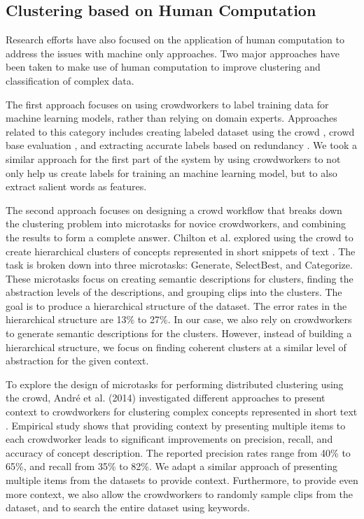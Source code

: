 \subsection{Clustering based on Human Computation}

Research efforts have also focused on the application of human computation 
to address the issues with machine only approaches. Two major approaches have
been taken to make use of human computation to improve clustering and 
classification of complex data. %

The first approach focuses on using crowdworkers to label training data for
machine learning models, rather than relying on domain experts. 
Approaches related to this category includes creating labeled dataset
using the crowd \cite{snow2008cheap}, crowd base evaluation
\cite{callison2009fast}, and extracting accurate labels based on redundancy
\cite{ipeirotis2010quality}. We took a similar approach for the first part of
the system by using crowdworkers to not only help us create labels
for training an machine learning model, but to also extract salient words as features.

The second approach focuses on designing a crowd workflow that breaks down the
clustering problem into microtasks for novice crowdworkers, and combining the
results to form a complete answer.  Chilton et al. explored using the crowd to
create hierarchical clusters of concepts represented in short snippets of text
\cite{chilton2013cascade}. The task is broken down into three microtasks:
Generate, SelectBest, and Categorize. These microtasks focus on creating
semantic descriptions for clusters, finding the abstraction levels of the
descriptions, and grouping clips into the clusters. The goal is to produce a
hierarchical structure of the dataset. The error rates in the hierarchical
structure are 13\% to 27\%.  In our case, we also rely on crowdworkers to
generate semantic descriptions for the clusters. However, instead of building a
hierarchical structure, we focus on finding coherent clusters at a similar
level of abstraction for the given context.

To explore the design of microtasks for performing distributed clustering using
the crowd, Andr\'e et al. (2014) investigated different approaches to present
context to crowdworkers for clustering complex concepts represented in short
text \cite{andre2014crowd}. Empirical study shows that providing context by
presenting multiple items to each crowdworker leads to significant improvements
on precision, recall, and accuracy of concept description.  The reported
precision rates range from 40\% to 65\%, and recall from 35\% to 82\%. We adapt a
similar approach of presenting multiple items from the datasets to provide
context.  Furthermore, to provide even more context, we also allow the
crowdworkers to randomly sample clips from the dataset, and to search the
entire dataset using keywords.


